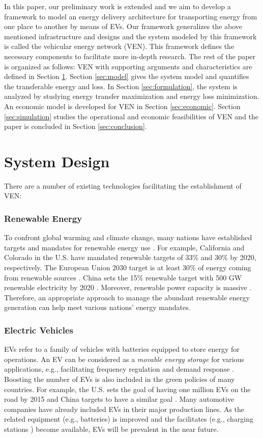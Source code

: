 \documentclass[journal]{IEEEtran}
\begin{document}
In this paper, our preliminary work \cite{VEN_conf} is extended and we aim to develop a framework to model an energy delivery architecture for transporting energy from one place to another by means of EVs. Our framework generalizes the above mentioned infrastructure and designs and the system  modeled by this framework is called the vehicular energy network (VEN). This framework defines the necessary components  to facilitate more in-depth research. 
The rest of the paper is organized as follows: VEN with supporting arguments and characteristics are defined in Section \ref{sec:VEN}. Section \ref{sec:model} gives the system model and quantifies the transferable energy and loss. In Section \ref{sec:formulation}, the system is analyzed by studying  energy transfer maximization and energy loss minimization. 
An economic model is developed for VEN in Section \ref{sec:economic}.
Section \ref{sec:simulation}  studies the operational and economic feasibilities of VEN and the paper is concluded in Section \ref{sec:conclusion}.


\section{System Design} \label{sec:VEN}

There are a number of existing technologies facilitating the establishment of VEN:
\subsubsection{Renewable Energy}
To confront global warming and climate change, many nations have established targets and mandates for renewable energy use \cite{targets}.  For example, California and Colorado in the U.S.  have mandated  renewable targets of 33\% and 30\% by 2020, respectively. The European Union 2030 target is at least 30\% of energy coming from renewable sources \cite{targets}. China sets the 15\% renewable target with 500 GW renewable electricity by 2020  \cite{targets}. Moreover, renewable power capacity is massive \cite{REN21}. Therefore, an appropriate approach to manage the abundant renewable energy generation can help meet various nations' energy mandates.

\subsubsection{Electric Vehicles}
EVs refer to a family of vehicles with batteries equipped to store energy for operations.
An EV can be considered as a \textit{movable energy storage} for various applications, e.g.,  facilitating frequency regulation \cite{regulation_TSG} and demand response \cite{TTE2}. Boosting the number of EVs is also included in the green policies of many countries. For example, the U.S. sets the goal of having one million EVs on the road by 2015 \cite{USEV} and China targets to have a similar goal \cite{ChinaEV}. Many automotive companies have already included EVs in their major production lines.
As the related equipment (e.g., batteries) is improved and the facilitates (e.g., charging stations \cite{EVCPP}) become available,  EVs will be prevalent in the near future.
\end{document}
